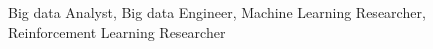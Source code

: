 

\begin{cvskills}

  \cvskill
    {Big data Analyst, Big data Engineer, Machine Learning Researcher, Reinforcement Learning Researcher}
    {}

\end{cvskills}